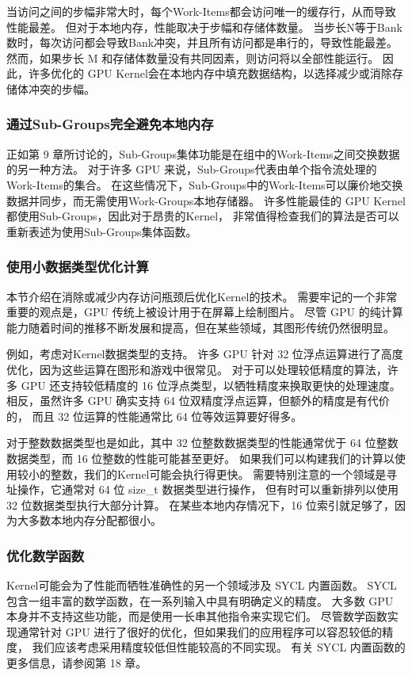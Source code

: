 当访问之间的步幅非常大时，每个Work-Items都会访问唯一的缓存行，从而导致性能最差。 
但对于本地内存，性能取决于步幅和存储体数量。 
当步长N等于Bank数时，每次访问都会导致Bank冲突，并且所有访问都是串行的，导致性能最差。 
然而，如果步长 M 和存储体数量没有共同因素，则访问将以全部性能运行。 
因此，许多优化的 GPU Kernel会在本地内存中填充数据结构，以选择减少或消除存储体冲突的步幅。

\subsubsection{通过Sub-Groups完全避免本地内存}
正如第 9 章所讨论的，Sub-Groups集体功能是在组中的Work-Items之间交换数据的另一种方法。 
对于许多 GPU 来说，Sub-Groups代表由单个指令流处理的Work-Items的集合。 
在这些情况下，Sub-Groups中的Work-Items可以廉价地交换数据并同步，而无需使用Work-Groups本地存储器。 
许多性能最佳的 GPU Kernel都使用Sub-Groups，因此对于昂贵的Kernel，
非常值得检查我们的算法是否可以重新表述为使用Sub-Groups集体函数。

\subsubsection{使用小数据类型优化计算}
本节介绍在消除或减少内存访问瓶颈后优化Kernel的技术。 
需要牢记的一个非常重要的观点是，GPU 传统上被设计用于在屏幕上绘制图片。 
尽管 GPU 的纯计算能力随着时间的推移不断发展和提高，但在某些领域，其图形传统仍然很明显。

例如，考虑对Kernel数据类型的支持。 许多 GPU 针对 32 位浮点运算进行了高度优化，因为这些运算在图形和游戏中很常见。 
对于可以处理较低精度的算法，许多 GPU 还支持较低精度的 16 位浮点类型，以牺牲精度来换取更快的处理速度。 
相反，虽然许多 GPU 确实支持 64 位双精度浮点运算，但额外的精度是有代价的，
而且 32 位运算的性能通常比 64 位等效运算要好得多。

对于整数数据类型也是如此，其中 32 位整数数据类型的性能通常优于 64 位整数数据类型，而 16 位整数的性能可能甚至更好。 
如果我们可以构建我们的计算以使用较小的整数，我们的Kernel可能会执行得更快。 
需要特别注意的一个领域是寻址操作，它通常对 64 位 size\_t 数据类型进行操作，
但有时可以重新排列以使用 32 位数据类型执行大部分计算。 
在某些本地内存情况下，16 位索引就足够了，因为大多数本地内存分配都很小。

\subsubsection{优化数学函数}
Kernel可能会为了性能而牺牲准确性的另一个领域涉及 SYCL 内置函数。 
SYCL 包含一组丰富的数学函数，在一系列输入中具有明确定义的精度。 
大多数 GPU 本身并不支持这些功能，而是使用一长串其他指令来实现它们。 
尽管数学函数实现通常针对 GPU 进行了很好的优化，但如果我们的应用程序可以容忍较低的精度，
我们应该考虑采用精度较低但性能较高的不同实现。 有关 SYCL 内置函数的更多信息，请参阅第 18 章。

